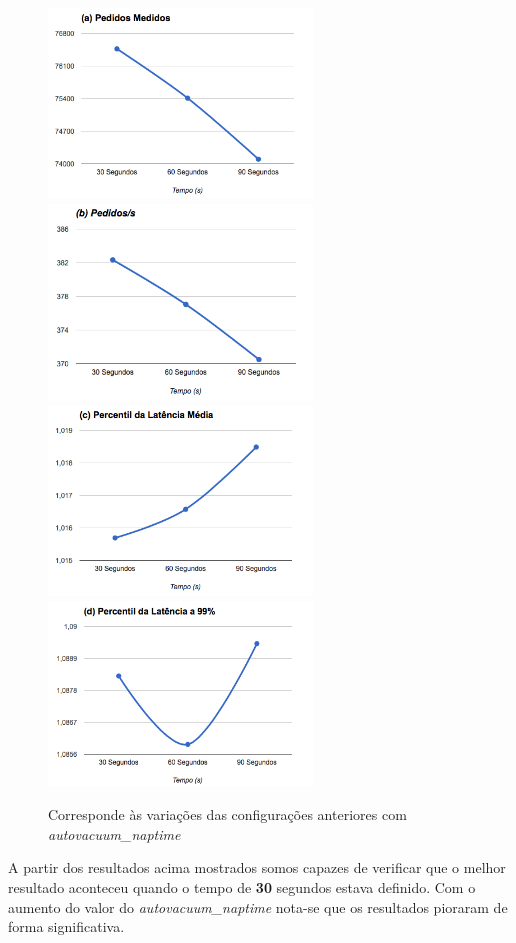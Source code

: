 \begin{figure}[ht!]
\centering
\includegraphics[width=70mm]{img/questao_3/sb_ecs_cs_vacuum_a.png}
\includegraphics[width=70mm]{img/questao_3/sb_ecs_cs_vacuum_b.png}
\includegraphics[width=70mm]{img/questao_3/sb_ecs_cs_vacuum_c.png}
\includegraphics[width=70mm]{img/questao_3/sb_ecs_cs_vacuum_d.png}
\caption{Corresponde às variações das configurações anteriores com \textit{autovacuum\_naptime}}
\end{figure}

A partir dos resultados acima mostrados somos capazes de verificar que o melhor resultado aconteceu quando o tempo de \textbf{30} segundos estava definido. Com o aumento do valor do \textit{autovacuum\_naptime} nota-se que os resultados pioraram de forma significativa.

